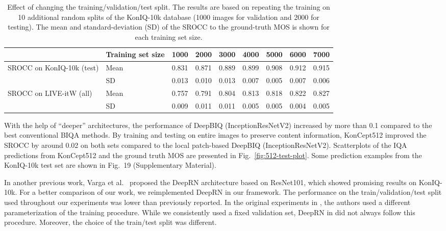 \documentclass[10pt,journal,compsoc]{IEEEtran}
\begin{document}
\begin{table*}[!ht]
\centering
\setlength\extrarowheight{2pt}
\begin{tabular}{lllllllll} \hline
 & Training set size & 1000  & 2000  & 3000  & 4000  & 5000  & 6000  & 7000  \\ \hline
\multirow{2}{*}{SROCC on KonIQ-10k (test)} & Mean        & 0.831 & 0.871 & 0.889 & 0.899 & 0.908 & 0.912 & 0.915 \\
                                & SD          & 0.013 & 0.010 & 0.013 & 0.007 & 0.005 & 0.007 & 0.006 \\ \hline
\multirow{2}{*}{SROCC on LIVE-itW (all)}       & Mean        & 0.757 & 0.791 & 0.804 & 0.813 & 0.818 & 0.822 & 0.827 \\
                                & SD          & 0.009 & 0.011 & 0.011 & 0.005 & 0.005 & 0.004 & 0.005 \\ \hline
\end{tabular}
\caption{Effect of changing the training/validation/test split. The results are based on repeating the training on 10 additional random splits of the KonIQ-10k database (1000 images for validation and 2000 for testing). The mean and standard-deviation (SD) of the SROCC to the ground-truth MOS is shown for each training set size.}
\label{tab:multiple-training-splits}
\vspace{-10pt}
\end{table*}


With the help of ``deeper'' architectures, the performance of DeepBIQ (InceptionResNetV2) increased by more than 0.1 compared to the best conventional BIQA methods. By training and testing on entire images to preserve content information, KonCept512 improved the SROCC by around 0.02 on both sets compared to the local patch-based DeepBIQ (InceptionResNetV2). Scatterplots of the IQA predictions from KonCept512 and the ground truth MOS are presented in Fig.~\ref{fig:512-test-plot}. Some prediction examples from the KonIQ-10k test set are shown in Fig.~19 (Supplementary Material).

In another previous work, Varga et al.\ \cite{varga2018deeprn} proposed the DeepRN architecture based on ResNet101, which showed promising results on KonIQ-10k. For a better comparison of our work, we reimplemented DeepRN in our framework. The performance on the train/validation/test split used throughout our experiments was lower than previously reported. In the original experiments in \cite{varga2018deeprn}, the authors used a different parameterization of the training procedure. While we consistently used a fixed validation set, DeepRN in \cite{varga2018deeprn} did not always follow this procedure. Moreover, the choice of the train/test split was different.
 
\end{document}
